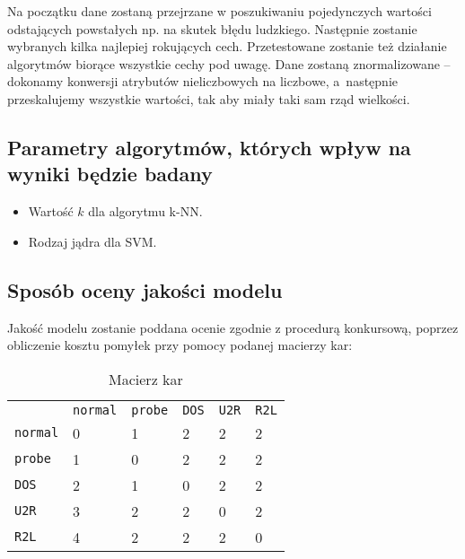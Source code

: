 \documentclass[a4paper, 12pt]{article}
\begin{document}
Na początku dane zostaną przejrzane w poszukiwaniu pojedynczych wartości odstających
powstałych np. na skutek błędu ludzkiego. Następnie zostanie wybranych kilka najlepiej rokujących
cech. Przetestowane zostanie też działanie algorytmów biorące wszystkie cechy pod uwagę.
Dane zostaną znormalizowane -- dokonamy konwersji atrybutów nieliczbowych na liczbowe,
a~następnie przeskalujemy wszystkie wartości, tak aby miały taki sam rząd wielkości.

\subsection{Parametry algorytmów, których wpływ na wyniki będzie badany}

\begin{itemize}
 \item Wartość $k$ dla algorytmu k-NN.
 \item Rodzaj jądra dla SVM.
\end{itemize}


\subsection{Sposób oceny jakości modelu}
Jakość modelu zostanie poddana ocenie zgodnie z procedurą konkursową,
poprzez obliczenie kosztu pomyłek przy pomocy podanej macierzy kar:

\begin{table}[H]
\centering
\begin{tabular}{ l l l l l l }
       & \texttt{normal}&\texttt{probe}	&\texttt{DOS}	&\texttt{U2R}	&\texttt{R2L} \\
\texttt{normal}	&0	&1	&2	&2	&2 \\
\texttt{probe}	&1	&0	&2	&2	&2 \\
\texttt{DOS}	&2	&1	&0	&2	&2 \\
\texttt{U2R}	&3	&2	&2	&0	&2 \\
\texttt{R2L}	&4	&2	&2	&2	&0 \\
\end{tabular}
\caption{Macierz kar}
\label{table:cov_matrix}
\end{table}


\end{document}
